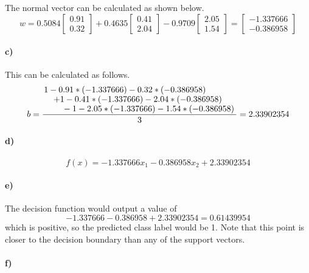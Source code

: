 \documentclass[12pt]{article}
\begin{document}
The normal vector can be calculated as shown below.
\[w=0.5084\begin{bmatrix}
    0.91\\
    0.32
\end{bmatrix}+0.4635\begin{bmatrix}
    0.41\\
    2.04
\end{bmatrix}-0.9709\begin{bmatrix}
    2.05\\
    1.54
\end{bmatrix}=\begin{bmatrix}
    -1.337666\\
    -0.386958
\end{bmatrix}\]

\paragraph{c)}

This can be calculated as follows.
\[b=\frac{\splitfrac{1-0.91*(-1.337666)-0.32*(-0.386958)}{\splitfrac{+1-0.41*(-1.337666)-2.04*(-0.386958)}{-1-2.05*(-1.337666)-1.54*(-0.386958)}}}{3}=2.33902354\]

\paragraph{d)}

\[f(x)=-1.337666x_1-0.386958x_2+2.33902354\]

\paragraph{e)}

The decision function would output a value of
\[-1.337666-0.386958+2.33902354=0.61439954\]
which is positive, so the predicted class label would be 1. Note that this point is closer to the decision boundary than any of the support vectors.

\paragraph{f)}
\end{document}
